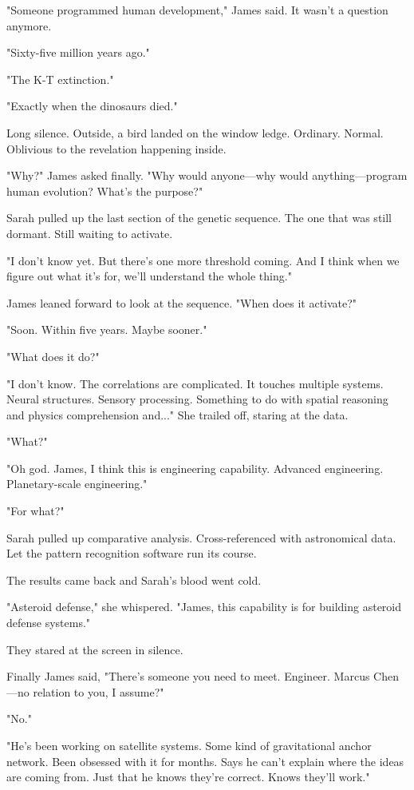 "Someone programmed human development," James said. It wasn't a question anymore.

"Sixty-five million years ago."

"The K-T extinction."

"Exactly when the dinosaurs died."

Long silence. Outside, a bird landed on the window ledge. Ordinary. Normal. Oblivious to the revelation happening inside.

"Why?" James asked finally. "Why would anyone—why would anything—program human evolution? What's the purpose?"

Sarah pulled up the last section of the genetic sequence. The one that was still dormant. Still waiting to activate.

"I don't know yet. But there's one more threshold coming. And I think when we figure out what it's for, we'll understand the whole thing."

James leaned forward to look at the sequence. "When does it activate?"

"Soon. Within five years. Maybe sooner."

"What does it do?"

"I don't know. The correlations are complicated. It touches multiple systems. Neural structures. Sensory processing. Something to do with spatial reasoning and physics comprehension and..." She trailed off, staring at the data.

"What?"

"Oh god. James, I think this is engineering capability. Advanced engineering. Planetary-scale engineering."

"For what?"

Sarah pulled up comparative analysis. Cross-referenced with astronomical data. Let the pattern recognition software run its course.

The results came back and Sarah's blood went cold.

"Asteroid defense," she whispered. "James, this capability is for building asteroid defense systems."

They stared at the screen in silence.

Finally James said, "There's someone you need to meet. Engineer. Marcus Chen—no relation to you, I assume?"

"No."

"He's been working on satellite systems. Some kind of gravitational anchor network. Been obsessed with it for months. Says he can't explain where the ideas are coming from. Just that he knows they're correct. Knows they'll work."

